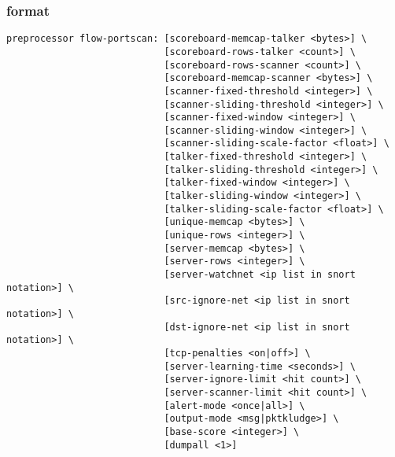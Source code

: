 \documentclass[english]{report}
\begin{document}
\subsubsection{format}
\begin{verbatim}
preprocessor flow-portscan: [scoreboard-memcap-talker <bytes>] \
                            [scoreboard-rows-talker <count>] \ 
                            [scoreboard-rows-scanner <count>] \
                            [scoreboard-memcap-scanner <bytes>] \
                            [scanner-fixed-threshold <integer>] \
                            [scanner-sliding-threshold <integer>] \
                            [scanner-fixed-window <integer>] \
                            [scanner-sliding-window <integer>] \
                            [scanner-sliding-scale-factor <float>] \
                            [talker-fixed-threshold <integer>] \
                            [talker-sliding-threshold <integer>] \
                            [talker-fixed-window <integer>] \
                            [talker-sliding-window <integer>] \
                            [talker-sliding-scale-factor <float>] \
                            [unique-memcap <bytes>] \
                            [unique-rows <integer>] \
                            [server-memcap <bytes>] \
                            [server-rows <integer>] \
                            [server-watchnet <ip list in snort notation>] \
                            [src-ignore-net <ip list in snort notation>] \
                            [dst-ignore-net <ip list in snort notation>] \
                            [tcp-penalties <on|off>] \
                            [server-learning-time <seconds>] \
                            [server-ignore-limit <hit count>] \
                            [server-scanner-limit <hit count>] \
                            [alert-mode <once|all>] \
                            [output-mode <msg|pktkludge>] \
                            [base-score <integer>] \
                            [dumpall <1>]    

\end{verbatim}
\end{document}
